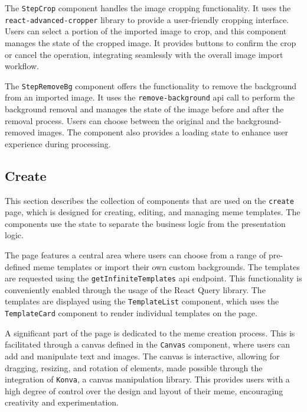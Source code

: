 
\newcommand{\mytexttt}[1]{\lstinline[style=myttstyle]!#1!}

The \texttt{StepCrop} component handles the image cropping functionality. It uses the \mytexttt{react-advanced-cropper} library to provide a user-friendly cropping interface. Users can select a portion of the imported image to crop, and this component manages the state of the cropped image. It provides buttons to confirm the crop or cancel the operation, integrating seamlessly with the overall image import workflow.

The \texttt{StepRemoveBg} component offers the functionality to remove the background from an imported image. It uses the \texttt{remove-background} \acrshort{api} call to perform the background removal and manages the state of the image before and after the removal process. Users can choose between the original and the background-removed images. The component also provides a loading state to enhance user experience during processing.

\subsection{Create}

This section describes the collection of components that are used on the \texttt{create} page, which is designed for creating, editing, and managing meme templates.  The components use the state to separate the business logic from the presentation logic.

The page features a central area where users can choose from a range of pre-defined meme templates or import their own custom backgrounds. The templates are requested using the \texttt{getInfiniteTemplates} \acrshort{api} endpoint. This functionality is conveniently enabled through the usage of the React Query library.\cite{react-query-infinite} The templates are displayed using the \texttt{TemplateList} component, which uses the \texttt{TemplateCard} component to render individual templates on the page.

A significant part of the page is dedicated to the meme creation process. This is facilitated through a canvas defined in the \texttt{Canvas} component, where users can add and manipulate text and images. The canvas is interactive, allowing for dragging, resizing, and rotation of elements, made possible through the integration of \texttt{Konva}, a canvas manipulation library. This provides users with a high degree of control over the design and layout of their meme, encouraging creativity and experimentation.

